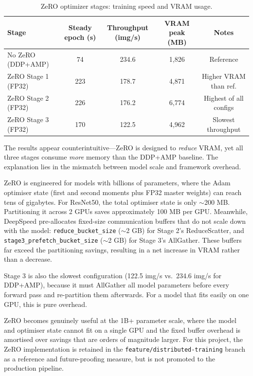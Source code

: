 \begin{table}[h]
\centering
\caption{ZeRO optimizer stages: training speed and VRAM usage.}
\label{tab:zero}
\begin{tabular}{lcccc}
\toprule
\textbf{Stage} & \textbf{Steady epoch (s)}
  & \textbf{Throughput (img/s)} & \textbf{VRAM peak (MB)} & \textbf{Notes} \\
\midrule
No ZeRO (DDP+AMP) &  74 & 234.6 & 1{,}826 & Reference \\
ZeRO Stage 1 (FP32) & 223 & 178.7 & 4{,}871 & Higher VRAM than ref. \\
ZeRO Stage 2 (FP32) & 226 & 176.2 & 6{,}774 & Highest of all configs \\
ZeRO Stage 3 (FP32) & 170 & 122.5 & 4{,}962 & Slowest throughput \\
\bottomrule
\end{tabular}
\end{table}

The results appear counterintuitive—ZeRO is designed to \emph{reduce}
VRAM, yet all three stages consume \emph{more} memory than the DDP+AMP
baseline. The explanation lies in the mismatch between model scale and
framework overhead.

ZeRO is engineered for models with billions of parameters, where the Adam
optimiser state (first and second moments plus FP32 master weights) can
reach tens of gigabytes. For ResNet50, the total optimiser state is only
$\sim$200 MB. Partitioning it across 2 GPUs saves approximately 100 MB
per GPU. Meanwhile, DeepSpeed pre-allocates fixed-size communication
buffers that do not scale down with the model:
\texttt{reduce\_bucket\_size} ($\sim$2 GB) for Stage 2's ReduceScatter,
and \texttt{stage3\_prefetch\_bucket\_size} ($\sim$2 GB) for Stage 3's
AllGather. These buffers far exceed the partitioning savings, resulting
in a net increase in VRAM rather than a decrease.

Stage 3 is also the slowest configuration (122.5 img/s vs.\ 234.6 img/s
for DDP+AMP), because it must AllGather all model parameters before every
forward pass and re-partition them afterwards. For a model that fits easily
on one GPU, this is pure overhead.

ZeRO becomes genuinely useful at the 1B+ parameter scale, where the model
and optimiser state cannot fit on a single GPU and the fixed buffer
overhead is amortised over savings that are orders of magnitude larger.
For this project, the ZeRO implementation is retained in the
\texttt{feature/distributed-training} branch as a reference and
future-proofing measure, but is not promoted to the production pipeline.

